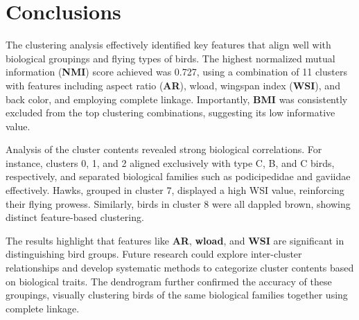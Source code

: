 \section{Conclusions}

The clustering analysis effectively identified key features that align well with
biological groupings and flying types of birds. The highest normalized mutual
information (\textbf{NMI}) score achieved was 0.727, using a combination of 11 clusters
with features including aspect ratio (\textbf{AR}), wload, wingspan index (\textbf{WSI}), and
back color, and employing complete linkage. Importantly, \textbf{BMI} was consistently
excluded from the top clustering combinations, suggesting its low informative value.

Analysis of the cluster contents revealed strong biological correlations. For
instance, clusters 0, 1, and 2 aligned exclusively with type C, B, and C birds,
respectively, and separated biological families such as podicipedidae and
gaviidae effectively. Hawks, grouped in cluster 7, displayed a high WSI value,
reinforcing their flying prowess. Similarly, birds in cluster 8 were all
dappled brown, showing distinct feature-based clustering.

The results highlight that features like \textbf{AR}, \textbf{wload}, and \textbf{WSI} are significant
in distinguishing bird groups. Future research could explore inter-cluster
relationships and develop systematic methods to categorize cluster contents
based on biological traits. The dendrogram further confirmed the accuracy
of these groupings, visually clustering birds of the same biological
families together using complete linkage.